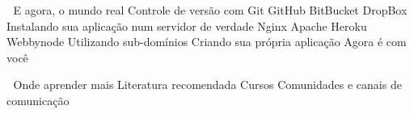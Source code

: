 \documentclass[12pt]{book} %
\begin{document}

E agora, o mundo real
Controle de versão com Git
GitHub
BitBucket
DropBox
Instalando sua aplicação num servidor de verdade
Nginx
Apache
Heroku
Webbynode
Utilizando sub-domínios
Criando sua própria aplicação
Agora é com você


Onde aprender mais
Literatura recomendada
Cursos
Comunidades e canais de comunicação
\end{document}

